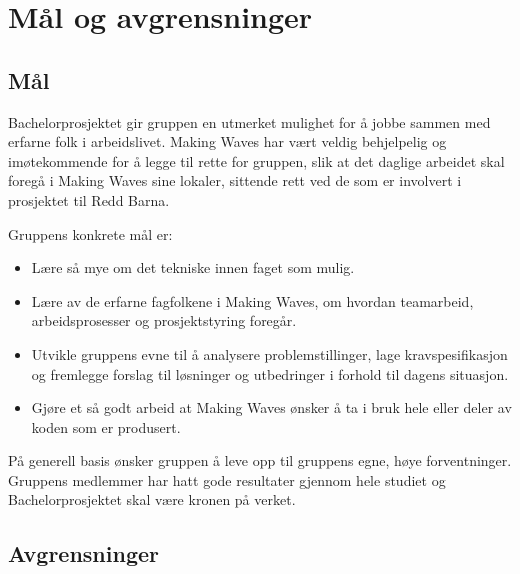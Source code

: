 \chapter{Mål og avgrensninger}
\section{Mål}
Bachelorprosjektet gir gruppen en utmerket mulighet for å jobbe sammen med erfarne folk i arbeidslivet. Making Waves har vært veldig behjelpelig og imøtekommende for å legge til rette for gruppen, slik at det daglige arbeidet skal foregå i Making Waves sine lokaler, sittende rett ved de som er involvert i prosjektet til Redd Barna.

Gruppens konkrete mål er:
\begin{itemize}
\item Lære så mye om det tekniske innen faget som mulig.
\item Lære av de erfarne fagfolkene i Making Waves, om hvordan teamarbeid, arbeidsprosesser og prosjektstyring foregår.
\item Utvikle gruppens evne til å analysere problemstillinger, lage kravspesifikasjon og fremlegge forslag til løsninger og utbedringer i forhold til dagens situasjon.
\item Gjøre et så godt arbeid at Making Waves ønsker å ta i bruk hele eller deler av koden som er produsert.
\end{itemize}

På generell basis ønsker gruppen å leve opp til gruppens egne, høye forventninger. Gruppens medlemmer har hatt gode resultater gjennom hele studiet og Bachelorprosjektet skal være kronen på verket.

\section{Avgrensninger}
